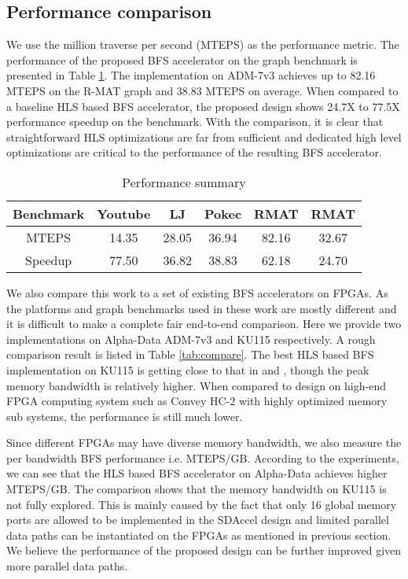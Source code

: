 \subsection{Performance comparison}
We use the million traverse per second (MTEPS) as 
the performance metric. The performance of the proposed BFS 
accelerator on the graph benchmark is 
presented in Table \ref{tab:performance-summary}. 
The implementation on ADM-7v3 achieves up to 
82.16 MTEPS on the R-MAT\uppercase\expandafter{} graph and 
38.83 MTEPS on average. When compared to a baseline HLS based 
BFS accelerator, the proposed design shows 24.7X to 77.5X performance 
speedup on the benchmark. 
With the comparison, it is clear that straightforward HLS optimizations 
are far from sufficient and dedicated high level optimizations are critical to 
the performance of the resulting BFS accelerator.
\begin{table}
  \vspace{-0.3em}
    \centering
  \caption{Performance summary}
  \vspace{-0.3em}
  \label{tab:performance-summary}
  \begin{tabular}{cccccc}
    \toprule
      Benchmark & Youtube & LJ & Pokec & RMAT\uppercase\expandafter{\romannumeral1} & RMAT\uppercase\expandafter{\romannumeral2} \\
    \midrule
      MTEPS & 14.35 & 28.05 & 36.94 & 82.16 & 32.67 \\
      Speedup & 77.50 & 36.82 & 38.83 & 62.18 & 24.70 \\
  \bottomrule
\end{tabular}
\vspace{-1em}
\end{table}

We also compare this work to a set of existing BFS accelerators on FPGAs. 
As the platforms and graph benchmarks used in these work are mostly different and it is 
difficult to make a complete fair end-to-end comparison. Here we provide two implementations 
on Alpha-Data ADM-7v3 and KU115 respectively. A rough comparison result is listed 
in Table \ref{tab:compare}. The best HLS based BFS implementation on KU115 is 
getting close to that in \cite{zhang2017boosting} 
and \cite{nurvitadhi2014graphgen}, though the peak memory bandwidth 
is relatively higher. When compared to design on high-end 
FPGA computing system such as Convey HC-2 with highly optimized memory sub systems, 
the performance is still much lower. 

Since different FPGAs may have diverse memory bandwidth, we also measure the 
per bandwidth BFS performance i.e. MTEPS/GB. According to the experiments, we 
can see that the HLS based BFS accelerator on Alpha-Data achieves higher 
MTEPS/GB. The comparison shows that the memory bandwidth on KU115 is not 
fully explored. This is mainly caused by the fact that only 16 global memory 
ports are allowed to be implemented in the SDAccel design and 
limited parallel data paths can be instantiated on the FPGAs as 
mentioned in previous section. We believe the performance of the 
proposed design can be further improved given more parallel data paths.

